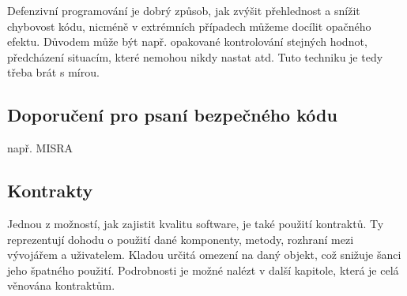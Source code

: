 		Defenzivní programování je dobrý způsob, jak zvýšit přehlednost a snížit chybovost kódu, nicméně v extrémních případech můžeme docílit opačného efektu. Důvodem může být např. opakované kontrolování stejných hodnot, předcházení situacím, které nemohou nikdy nastat atd. Tuto techniku je tedy třeba brát s mírou.
		
	
	\subsection{Doporučení pro psaní bezpečného kódu}
		např. MISRA
	
	\subsection{Kontrakty}
		Jednou z možností, jak zajistit kvalitu software, je také použití kontraktů. Ty reprezentují dohodu o použití dané komponenty, metody, rozhraní mezi vývojářem a uživatelem. Kladou určitá omezení na daný objekt, což snižuje šanci jeho špatného použití. Podrobnosti je možné nalézt v další kapitole, která je celá věnována kontraktům.